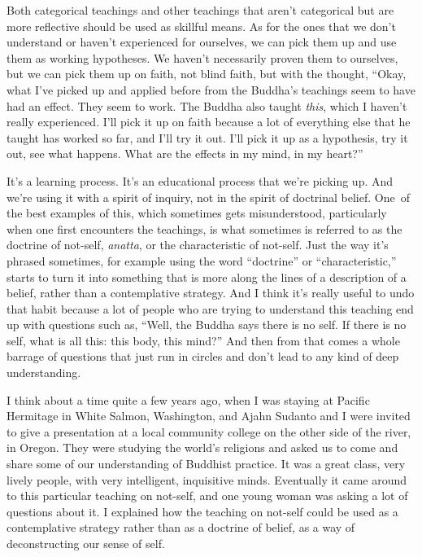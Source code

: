 Both categorical teachings and other teachings that aren't categorical but are more reflective should be used as skillful means. As for the ones that we don't understand or haven't experienced for ourselves, we can pick them up and use them as working hypotheses. We haven't necessarily proven them to ourselves, \linebreak but we can pick them up on faith, not blind faith, but \linebreak with the thought, ``Okay, what I've picked up and applied before from the Buddha's teachings seem to have had an effect. They seem to work. The Buddha also taught \emph{this}, which I haven't really experienced. I'll pick it up on faith because a lot of everything else that he taught has worked so far, and I'll try it out. I'll pick it up as a hypothesis, try it out, see what happens. What are the effects in my mind, in my heart?''

It's a learning process. It's an educational process that we're picking up. And we're using it with a spirit \linebreak of inquiry, not in the spirit of doctrinal belief. \mbox{One of} the best examples of this, which sometimes gets misunderstood, particularly when one first encounters the teachings, is what sometimes is referred to as the doctrine of not-self, \emph{anatta}, or the characteristic of not-self. Just the way it's phrased sometimes, for example using the word ``doctrine'' or ``characteristic,'' starts to turn it into something that is more along the lines of a description of a belief, rather than a contemplative strategy. And I think it's really useful to undo that habit because a lot of people who are trying to understand this teaching end up with questions such as, ``Well, the Buddha says there is no self. If there is no self, what is all this: this body, this mind?'' And then from that comes a whole barrage of questions that just run in circles and don't lead to any kind of deep understanding.

I think about a time quite a few years ago, when I was staying at Pacific Hermitage in White Salmon, Washington, and Ajahn Sudanto and I were invited to give a presentation at a local community college on the other side of the river, in Oregon. They were studying the world's religions and asked us to come and share some of our understanding of Buddhist practice. It was a great class, very lively people, with very intelligent, inquisitive minds. Eventually it came around to this particular teaching on not-self, and one young woman was asking a lot of questions about it. I explained how the teaching on not-self could be used as a contemplative strategy rather than as a doctrine of belief, as a way of deconstructing our sense of self.

